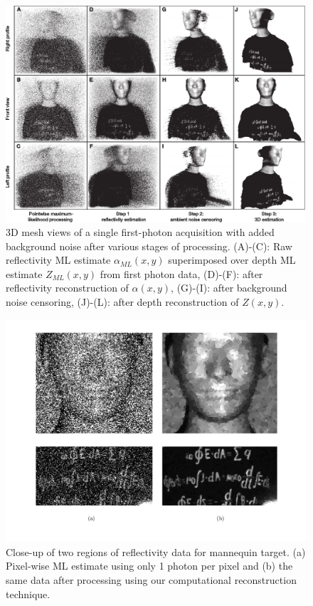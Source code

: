 \begin{figure}[h!]
\centering
\includegraphics[width=\textwidth]{figure-first-mannequin.pdf}
\caption{3D mesh views of a single first-photon acquisition with added background noise after various stages of processing. (A)-(C): Raw reflectivity ML estimate $\alpha_{ML}(x,y)$ superimposed over depth ML estimate $Z_{ML}(x,y)$ from first photon data, (D)-(F): after reflectivity reconstruction of $\alpha(x,y)$, (G)-(I): after background noise censoring, (J)-(L): after depth reconstruction of $Z(x,y)$.}
\label{figure:first-mannequin}
\end{figure}


\begin{figure}[h!]
\centerline{\includegraphics[width=\textwidth]{figure-first-mannequin-zoom.pdf}}
\caption{Close-up of two regions of reflectivity data for mannequin target. (a) Pixel-wise ML estimate using only 1 photon per pixel and (b) the same data after processing using our computational reconstruction technique.}
\label{figure:first-mannequin-zoom}
\end{figure}

